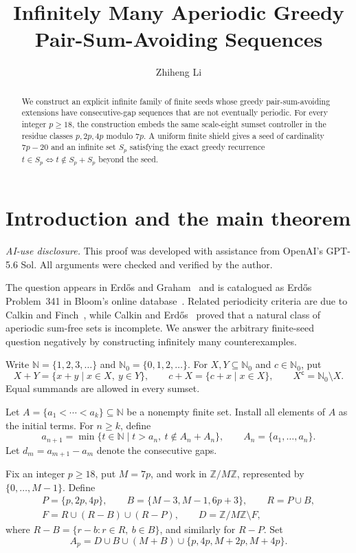 \documentclass[11pt,letterpaper]{article}
\title{Infinitely Many Aperiodic Greedy Pair-Sum-Avoiding Sequences}
\author{Zhiheng Li}
\date{}
\newcommand{\N}{\mathbb{N}}
\newcommand{\Nzero}{\mathbb{N}_0}
\newcommand{\ZM}{\mathbb{Z}/M\mathbb{Z}}
\newcommand{\cpl}[1]{#1^{\mathsf{c}}}
\begin{document}
\maketitle

\begin{abstract}
We construct an explicit infinite family of finite seeds whose greedy pair-sum-avoiding extensions have consecutive-gap sequences that are not eventually periodic. For every integer \(p\geq18\), the construction embeds the same scale-eight sumset controller in the residue classes \(p,2p,4p\) modulo \(7p\). A uniform finite shield gives a seed of cardinality \(7p-20\) and an infinite set \(S_p\) satisfying the exact greedy recurrence \(t\in S_p\Longleftrightarrow t\notin S_p+S_p\) beyond the seed.
\end{abstract}

\section{Introduction and the main theorem}

\noindent\textit{AI-use disclosure.} This proof was developed with assistance from OpenAI's GPT-5.6 Sol. All arguments were checked and verified by the author.

The question appears in Erd\H{o}s and Graham~\cite[p.~53]{ErdosGraham1980} and is catalogued as Erd\H{o}s Problem~341 in Bloom's online database~\cite{Bloom341}. Related periodicity criteria are due to Calkin and Finch~\cite{CalkinFinch1996}, while Calkin and Erd\H{o}s~\cite{CalkinErdos1996} proved that a natural class of aperiodic sum-free sets is incomplete. We answer the arbitrary finite-seed question negatively by constructing infinitely many counterexamples.

Write \(\N=\{1,2,3,\ldots\}\) and \(\Nzero=\{0,1,2,\ldots\}\). For \(X,Y\subseteq\Nzero\) and \(c\in\Nzero\), put
\[
X+Y=\{x+y\mid x\in X,\ y\in Y\},
\qquad
c+X=\{c+x\mid x\in X\},
\qquad
\cpl{X}=\Nzero\setminus X.
\]
Equal summands are allowed in every sumset.

Let \(A=\{a_1<\cdots<a_k\}\subseteq\N\) be a nonempty finite set. Install all elements of \(A\) as the initial terms. For \(n\geq k\), define
\begin{equation}\label{eq:greedy-definition}
a_{n+1}
=\min\{t\in\N\mid t>a_n,\ t\notin A_n+A_n\},
\qquad
A_n=\{a_1,\ldots,a_n\}.
\end{equation}
Let \(d_m=a_{m+1}-a_m\) denote the consecutive gaps.

Fix an integer \(p\geq18\), put \(M=7p\), and work in \(\ZM\), represented by \(\{0,\ldots,M-1\}\). Define
\begin{equation}\label{eq:parametric-PBRFD}
\begin{gathered}
P=\{p,2p,4p\},
\qquad
B=\{M-3,M-1,6p+3\},
\qquad R=P\cup B,\\
F=R\cup(R-B)\cup(R-P),
\qquad
D=\ZM\setminus F,
\end{gathered}
\end{equation}
where \(R-B=\{r-b:r\in R,\ b\in B\}\), and similarly for \(R-P\). Set
\begin{equation}\label{eq:seed-family}
A_p=D\cup B\cup(M+B)\cup\{p,4p,M+2p,M+4p\}.
\end{equation}
\end{document}
